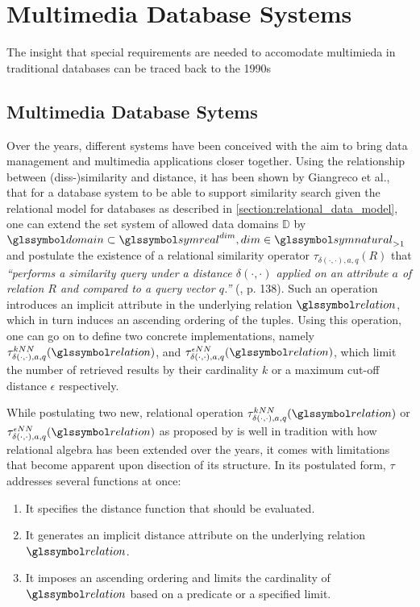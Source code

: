 \chapter{Multimedia Database Systems}
\label{chapter:theory_multimedia_database}

The insight that special requirements are needed to accomodate multimieda in traditional databases can be traced back to the 1990s \cite{Marcus:1996Foundations,Adjeroh:1997Multimedia}


\section{Multimedia Database Sytems}


Over the years, different systems have been conceived with the aim to bring data management and multimedia applications closer together. Using the relationship between (diss-)similarity and distance, it has been shown by Giangreco et al., that for a database system to be able to support similarity search given the relational model for databases as described in \cref{section:relational_data_model}, one can extend the set system of allowed data domains $\mathbb{D}$ by $\domain \subset \symreal^{dim}, dim \in \symnatural_{>1}$ and postulate the existence of a relational similarity operator $\tau_{\delta(\cdot,\cdot),a,q}(R)$ that \emph{``performs a similarity query under a distance $\delta(\cdot,\cdot)$ applied on an attribute $a$ of relation $R$ and compared to a query vector $q$.''} (\cite{Giangreco:2018Database}, p. 138). Such an operation introduces an implicit attribute in the underlying relation $\relation$, which in turn induces an ascending ordering of the tuples. Using this operation, one can go on to define two concrete implementations, namely $\tau^{kNN}_{\delta(\cdot,\cdot),a,q}(\relation)$, and $\tau^{\epsilon NN}_{\delta(\cdot,\cdot),a,q}(\relation)$, which limit the number of retrieved results by their cardinality $k$ or a maximum cut-off distance $\epsilon$ respectively.

While postulating two new, relational operation $\tau^{kNN}_{\delta(\cdot,\cdot),a,q}(\relation)$ or $\tau^{\epsilon NN}_{\delta(\cdot,\cdot),a,q}(\relation)$ as proposed by \cite{Giangreco:2018Database} is well in tradition with how relational algebra has been extended over the years, it comes with limitations that become apparent upon disection of its structure. In its postulated form, $\tau$ addresses several functions at once:

\begin{enumerate}
    \item It specifies the distance function that should be evaluated.
    \item It generates an implicit distance attribute on the underlying relation $\relation$.
    \item It imposes an ascending ordering and limits the cardinality of $\relation$ based on a predicate or a specified limit.
\end{enumerate}

